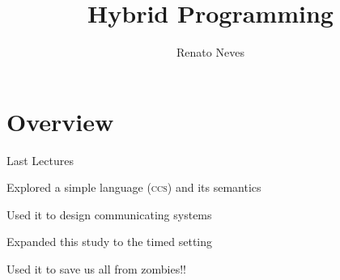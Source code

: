 \documentclass{beamer}
\author[Renato Neves]{Renato Neves}
\date{}
\begin{document}
\title{Hybrid Programming}

\frame[plain]{\titlepage}

\section{Overview}

\begin{frame}{Last Lectures}
       
       Explored a simple language (\textsc{ccs}) and its semantics

       Used it to design \alert{communicating} systems

       Expanded this study to the \alert{timed} setting
       
       Used it to save us all from zombies!!

\end{frame}
\end{document}
